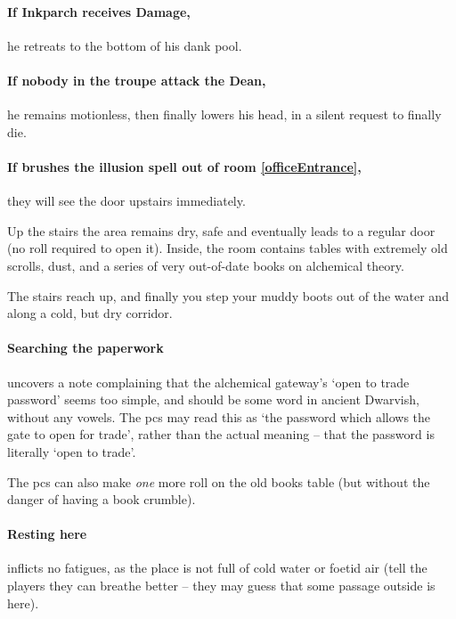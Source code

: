 \paragraph{If Inkparch receives Damage,}
he retreats to the bottom of his dank pool.

\paragraph{If nobody in the troupe attack the Dean,}
he remains motionless, then finally lowers his head, in a silent request to finally die.

\paragraph{If  brushes the illusion spell out of room \ref{officeEntrance},}
they will see the door upstairs immediately.


Up the stairs the area remains dry, safe and eventually leads to a regular door (no roll required to open it).
Inside, the room contains tables with extremely old scrolls, dust, and a series of very out-of-date books on alchemical theory.

\begin{boxtext}
  The stairs reach up, and finally you step your muddy boots out of the water and along a cold, but dry corridor.
\end{boxtext}

\paragraph{Searching the paperwork}
uncovers a note complaining that the alchemical gateway's `open to trade password' seems too simple, and should be some word in ancient Dwarvish, without any vowels.
The \glspl{pc} may read this as `the password which allows the gate to open for trade', rather than the actual meaning -- that the password is literally `open to trade'.

The \glspl{pc} can also make \emph{one} more roll on the old books table  (but without the danger of having a book crumble).

\paragraph{Resting here}
inflicts no \glspl{fatigue}, as the place is not full of cold water or foetid air (tell the players they can breathe better -- they may guess that some passage outside is here).

